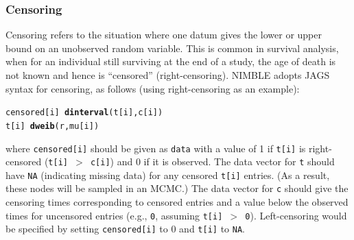 \documentclass[12pt,oneside]{book}\usepackage[]{graphicx}\usepackage[]{color}
\makeatletter
\newcommand{\hlopt}[1]{\textcolor[rgb]{0,0,0}{#1}}%
\newcommand{\hlstd}[1]{\textcolor[rgb]{0.345,0.345,0.345}{#1}}%
\newcommand{\hlkwd}[1]{\textcolor[rgb]{0.737,0.353,0.396}{\textbf{#1}}}%
\newenvironment{kframe}{%
 \def\at@end@of@kframe{}%
 \ifinner\ifhmode%
  \def\at@end@of@kframe{\end{minipage}}%
  \begin{minipage}{\columnwidth}%
 \fi\fi%
 \def\FrameCommand##1{\hskip\@totalleftmargin \hskip-\fboxsep
 \colorbox{shadecolor}{##1}\hskip-\fboxsep
     \hskip-\linewidth \hskip-\@totalleftmargin \hskip\columnwidth}%
 \MakeFramed {\advance\hsize-\width
   \@totalleftmargin\z@ \linewidth\hsize
   \@setminipage}}%
 {\par\unskip\endMakeFramed%
 \at@end@of@kframe}
\newenvironment{knitrout}{}{} %
\def\cd#1{\texttt{#1}}
\makeatother
\begin{document}
\subsubsection{Censoring} Censoring refers to the situation where one datum gives the lower or upper bound on an unobserved random variable.  This is common in survival analysis, when for an individual still surviving at the end of a study, the age of death is not known and hence is ``censored'' (right-censoring).  NIMBLE adopts JAGS syntax for censoring, as follows (using right-censoring as an example):
\begin{knitrout}
\color{fgcolor}\begin{kframe}
\begin{alltt}
\hlstd{censored[i]} \hlopt{~} \hlkwd{dinterval}\hlstd{(t[i], c[i])}
\hlstd{t[i]} \hlopt{~} \hlkwd{dweib}\hlstd{(r, mu[i])}
\end{alltt}
\end{kframe}
\end{knitrout}
where \cd{censored[i]} should be given as \cd{data} with a value of 1 if
\cd{t[i]} is right-censored (\cd{t[i] $>$ c[i]}) and 0 if it is
observed.  The data vector for \cd{t} should have \cd{NA} (indicating
missing data) for any censored \cd{t[i]} entries. (As a result, these
nodes will be sampled in an MCMC.)  The data vector for \cd{c} should
give the censoring times corresponding to censored entries and a value
below the observed times for uncensored entries (e.g., \cd{0}, assuming \cd{t[i] $>$ 0}). Left-censoring would be specified by setting \cd{censored[i]} to 0 and \cd{t[i]} to \cd{NA}. 
  
\end{document}
